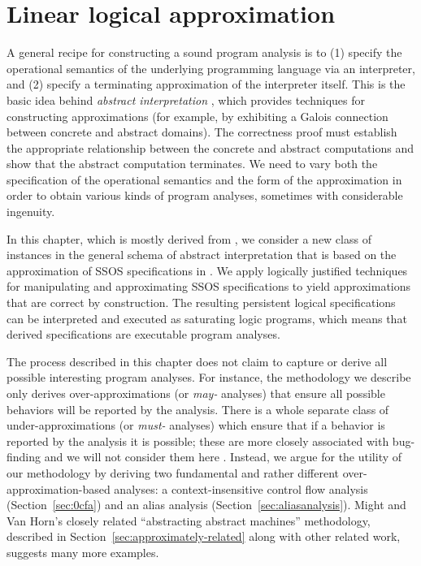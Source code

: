 \chapter{Linear logical approximation}
\label{chapter-approx}

A general recipe for constructing a sound program analysis is to (1)
specify the operational semantics of the underlying programming
language via an interpreter, and (2) specify a terminating
approximation of the interpreter itself. This is the basic idea behind
{\it abstract interpretation} \cite{cousot77abstract}, which provides
techniques for constructing approximations (for example, by exhibiting
a Galois connection between concrete and abstract domains). The
correctness proof must establish the appropriate relationship between
the concrete and abstract computations and show that the abstract
computation terminates. We need to vary both the specification of the
operational semantics and the form of the approximation in order to
obtain various kinds of program analyses, sometimes with considerable
ingenuity.

In this chapter, which is mostly derived from \cite{simmons11logical},
we consider a new class of instances in the general schema of abstract
interpretation that is based on the approximation of SSOS
specifications in \sls. We apply logically justified techniques for
manipulating and approximating SSOS specifications to yield
approximations that are correct by construction. The resulting
persistent logical specifications can be interpreted and executed as
saturating logic programs, which means that derived specifications
are executable program analyses.

The process described in this chapter does not claim to capture or 
derive all possible interesting program analyses. For
instance, the methodology we describe only derives over-approximations
(or {\it may-} analyses) that ensure all possible behaviors will be
reported by the analysis. There is a whole separate class of 
under-approximations (or {\it must-} analyses) which ensure that if a
behavior is reported by the analysis it is possible; these are more
closely associated with bug-finding and we will not consider them here
\cite{godefroid10compositional}. Instead, we argue for the utility of
our methodology by deriving two fundamental and rather different
over-approximation-based analyses: a context-insensitive control flow
analysis (Section~\ref{sec:0cfa}) and an alias analysis
(Section~\ref{sec:aliasanalysis}). Might and Van Horn's closely
related ``abstracting abstract machines'' methodology, described in
Section~\ref{sec:approximately-related} along with other related work,
suggests many more examples.

